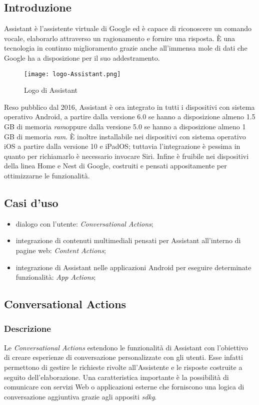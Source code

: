 	\subsection{Introduzione}
	Assistant è l'assistente virtuale di Google ed è capace di riconoscere un comando vocale, elaborarlo attraverso un ragionamento e fornire una risposta. È una tecnologia in continuo miglioramento grazie anche all'immensa mole di dati che Google ha a disposizione per il suo addestramento.
	
	\begin{figure}[htbp]
		\begin{center}
			\texttt{[image: logo-Assistant.png]}
			\caption{Logo di Assistant}
		\end{center}
	\end{figure}
\pagebreak
	
	Reso pubblico dal 2016, Assistant è ora integrato in tutti i dispositivi con sistema operativo Android, a partire dalla versione 6.0 se hanno a disposizione almeno 1.5 GB di memoria \emph{\gls{ram}}\glsfirstoccur oppure dalla versione 5.0 se hanno a disposizione almeno 1 GB di memoria \emph{\gls{ram}}. È inoltre installabile nei dispositivi con sistema operativo iOS a partire dalla versione 10 e iPadOS; tuttavia l'integrazione è pessima in quanto per richiamarlo è necessario invocare Siri. Infine è fruibile nei dispositivi della linea Home e Nest di Google, costruiti e pensati appositamente per ottimizzarne le funzionalità.
	\subsection{Casi d'uso}
	\begin{itemize}
		\item dialogo con l'utente: \emph{Conversational Actions};
		\item integrazione di contenuti multimediali pensati per Assistant all'interno di pagine web: \emph{Content Actions};
		\item integrazione di Assistant nelle applicazioni Android per eseguire determinate funzionalità: \emph{App Actions};
	\end{itemize}
	\subsection{Conversational Actions}
		\subsubsection{Descrizione}
		Le \emph{Conversational Actions} estendono le funzionalità di Assistant con l'obiettivo di creare esperienze di conversazione personalizzate con gli utenti. Esse infatti permettono di gestire le richieste rivolte all'Assistente e le risposte costruite a seguito dell'elaborazione. Una caratteristica importante è la possibilità di comunicare con servizi Web o applicazioni esterne che forniscono una logica di conversazione aggiuntiva grazie agli appositi \emph{\gls{sdkg}}\glsfirstoccur.
